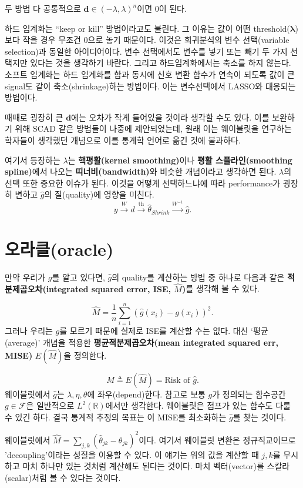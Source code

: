 \documentclass[b5paper,]{book}
\theoremstyle{definition}
\theoremstyle{definition}
\theoremstyle{definition}
\theoremstyle{remark}
\begin{document}
두 방법 다 공통적으로 \(\mathbf{d} \in (-\lambda, \lambda)^{n}\)이면 0이
된다.

하드 임계화는 ``keep or kill'' 방법이라고도 불린다. 그 이유는 값이 어떤
threshold(\(\mathbf{\lambda}\))보다 작을 경우 무조건 0으로 놓기
때문이다. 이것은 회귀분석의 변수 선택(variable selection)과 동일한
아이디어이다. 변수 선택에서도 변수를 넣기 또는 빼기 두 가지 선택지만
있다는 것을 생각하기 바란다. 그리고 하드임계화에서는 축소를 하지 않는다.
소프트 임계화는 하드 임계화를 함과 동시에 신호 변환 함수가 연속이 되도록
값이 큰 signal도 같이 축소(shrinkage)하는 방법이다. 이는 변수선택에서
LASSO와 대응되는 방법이다.

때때로 굉장히 큰 \(\mathbf{d}\)에는 오차가 작게 들어있을 것이라 생각할
수도 있다. 이를 보완하기 위해 SCAD 같은 방법들이 나중에 제안되었는데,
원래 이는 웨이블릿을 연구하는 학자들이 생각했던 개념으로 이를 통계학
언어로 옮긴 것에 불과하다.

여기서 등장하는 \(\lambda\)는 \textbf{핵평활(kernel smoothing)}이나
\textbf{평활 스플라인(smoothing spline)}에서 나오는
\textbf{띠너비(bandwidth)}와 비슷한 개념이라고 생각하면 된다.
\(\lambda\)의 선택 또한 중요한 이슈가 된다. 이것을 어떻게 선택하느냐에
따라 performance가 굉장히 변하고 \(\hat{g}\)의 질(quality)에 영향을
미친다.
\[y \xrightarrow{W} d \xrightarrow{\text{th}} \hat{\theta}_{Shrink} \xrightarrow{W^{-1}} \hat{g}.\]

\section{오라클(oracle)}\label{oracle}

만약 우리가 \(g\)를 알고 있다면, \(\hat{g}\)의 quality를 계산하는 방법
중 하나로 다음과 같은 \textbf{적분제곱오차(integrated squared error,
ISE, \(\hat{M}\))}를 생각해 볼 수 있다.

\[\hat{M}=\frac{1}{n}\sum_{i=1}^{n}(\hat{g}(x_{i})-g(x_{i}))^{2}.\]
그러나 우리는 \(g\)를 모르기 때문에 실제로 ISE를 계산할 수는 없다. 대신
`평균(average)' 개념을 적용한 \textbf{평균적분제곱오차(mean integrated
squared err, MISE)} \(E(\hat{M})\)을 정의한다.

\[ M \triangleq E(\hat{M})=\text{Risk of }\hat{g}.\] 웨이블릿에서
\(\hat{g}\)는 \(\lambda, \eta, \theta\)에 좌우(depend)한다. 참고로 보통
\(g\)가 정의되는 함수공간 \(g \in \mathcal{F}\)은 일반적으로
\(L^{2}(\mathbb{R})\)에서만 생각한다. 웨이블릿은 점프가 있는 함수도 다룰
수 있긴 하다. 결국 통계적 추정의 목표는 이 MISE를 최소화하는
\(\hat{g}\)를 찾는 것이다.

웨이블릿에서
\(\hat{M}=\sum_{j,k}(\hat{\theta}_{jk}-\theta_{jk})^{2}\)이다. 여기서
웨이블릿 변환은 정규직교이므로 'decoupling'이라는 성질을 이용할 수 있다.
이 얘기는 위의 값을 계산할 때 \(j,k\)를 무시하고 마치 하나만 있는 것처럼
계산해도 된다는 것이다. 마치 벡터(vector)를 스칼라(scalar)처럼 볼 수
있다는 것이다.
\end{document}
